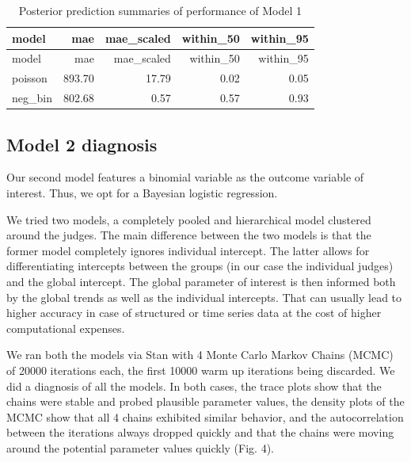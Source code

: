 \documentclass[
  11pt,
]{article}
\begin{document}
\begin{longtable}[]{@{}lrrrr@{}}
\caption{Posterior prediction summaries of performance of Model
1}\tabularnewline
\toprule\noalign{}
model & mae & mae\_scaled & within\_50 & within\_95 \\
\midrule\noalign{}
\endfirsthead
\toprule\noalign{}
model & mae & mae\_scaled & within\_50 & within\_95 \\
\midrule\noalign{}
\endhead
\bottomrule\noalign{}
\endlastfoot
poisson & 893.70 & 17.79 & 0.02 & 0.05 \\
neg\_bin & 802.68 & 0.57 & 0.57 & 0.93 \\
\end{longtable}

\hypertarget{model-2-diagnosis}{%
\subsection{Model 2 diagnosis}\label{model-2-diagnosis}}

Our second model features a binomial variable as the outcome variable of
interest. Thus, we opt for a Bayesian logistic regression.

We tried two models, a completely pooled and hierarchical model
clustered around the judges. The main difference between the two models
is that the former model completely ignores individual intercept. The
latter allows for differentiating intercepts between the groups (in our
case the individual judges) and the global intercept. The global
parameter of interest is then informed both by the global trends as well
as the individual intercepts. That can usually lead to higher accuracy
in case of structured or time series data at the cost of higher
computational expenses.

We ran both the models via Stan with 4 Monte Carlo Markov Chains (MCMC)
of 20000 iterations each, the first 10000 warm up iterations being
discarded. We did a diagnosis of all the models. In both cases, the
trace plots show that the chains were stable and probed plausible
parameter values, the density plots of the MCMC show that all 4 chains
exhibited similar behavior, and the autocorrelation between the
iterations always dropped quickly and that the chains were moving around
the potential parameter values quickly (Fig. 4).

\vspace{25pt}
\end{document}

